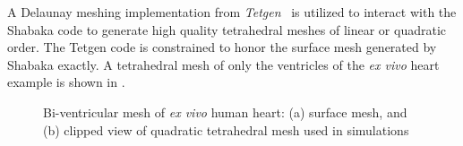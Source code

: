 A Delaunay meshing implementation from \textit{Tetgen}~\cite{tetgen} is utilized to interact with the Shabaka code to generate high quality tetrahedral meshes of linear or quadratic order. The Tetgen code is constrained to honor the surface mesh generated by Shabaka exactly. A tetrahedral mesh of only the ventricles of the \textit{ex vivo} heart example is shown in .
\begin{figure}[htbp!]
\centering
{}
%
\caption{Bi-ventricular mesh of \textit{ex vivo} human heart: (a) surface mesh, and (b) clipped view of quadratic tetrahedral mesh used in simulations}
\label{fig:tetmesh}
\end{figure}


